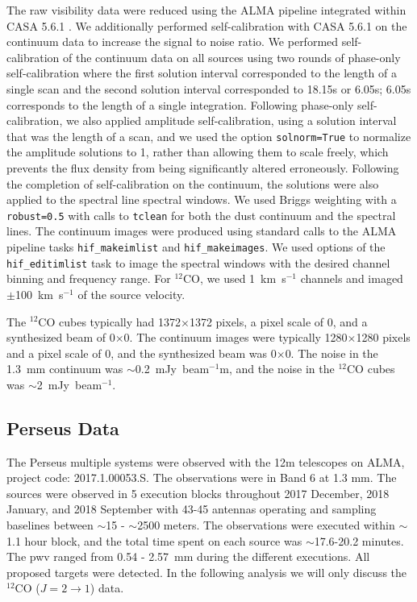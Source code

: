 \documentclass[linenumbers,twocolumn, twocolappendix]{aastex631}
\begin{document}
The raw visibility data were reduced using the ALMA pipeline integrated within CASA 5.6.1 \citep{CASA}. We additionally performed self-calibration with CASA 5.6.1 on the continuum data to increase the signal to noise ratio. We performed self-calibration of the continuum data on all sources using two rounds of phase-only self-calibration where the first solution interval corresponded to the length of a single scan and the second solution interval corresponded to 18.15s or 6.05s; 6.05s corresponds to the length of a single integration. Following phase-only self-calibration, we also applied amplitude self-calibration, using a solution interval that was the length of a scan, and we used the option \texttt{solnorm=True} to normalize the amplitude solutions to 1, rather than allowing them to scale freely, which prevents the flux density from being significantly altered erroneously. Following the completion of self-calibration on the continuum, the solutions were also applied to the spectral line spectral windows. We used Briggs weighting with a \texttt{robust=0.5} with calls to \texttt{tclean} for both the dust continuum and the spectral lines. The continuum images were produced using standard calls to the ALMA pipeline tasks \texttt{hif\_makeimlist} and \texttt{hif\_makeimages}. We used options of the \texttt{hif\_editimlist} task to image the spectral windows with the desired channel binning and frequency range. For $^{12}$CO, we used 1~km~s$^{-1}$ channels and imaged $\pm$100~km~s$^{-1}$ of the source velocity. 

The $^{12}$CO cubes typically had 1372$\times$1372 pixels, a pixel scale of 0, and a synthesized beam of 0$\times$0. The continuum images were typically 1280$\times$1280 pixels and a pixel scale of 0, and the synthesized beam was 0$\times$0. The noise in the 1.3~mm continuum was $\sim$0.2~mJy~beam$^{-1}$m, and the noise in the $^{12}$CO cubes was $\sim$2~mJy~beam$^{-1}$.

\subsection{Perseus Data} \label{sec:obs:perseus}
The Perseus multiple systems were observed with the 12m telescopes on ALMA, project code: 2017.1.00053.S. The observations were in Band 6 at 1.3 mm. The sources were observed in 5 execution blocks throughout 2017 December, 2018 January, and 2018 September with 43-45 antennas operating and sampling baselines between $\sim$15 - $\sim$2500 meters. The observations were executed within $\sim$1.1 hour block, and the total time spent on each source was $\sim$17.6-20.2 minutes. The pwv ranged from 0.54 - 2.57~mm during the different executions.  All proposed targets were detected. In the following analysis we will only discuss the $^{12}$CO ($J=2\rightarrow1$) data. 
\end{document}
